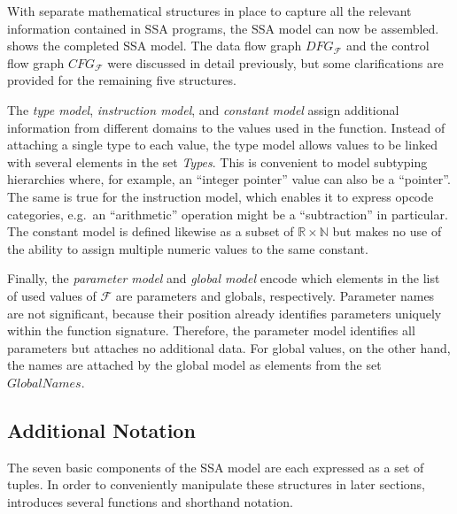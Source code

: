 \begin{figure}[p]
    
\end{figure}

    With separate mathematical structures in place to capture all the relevant
    information contained in SSA programs, the SSA model can now be assembled.
     shows the completed SSA model.
    The data flow graph $DFG_\mathcal F$ and the control flow graph
    $CFG_\mathcal F$ were discussed in detail previously, but some
    clarifications are provided for the remaining five structures.

    The {\it type model}, {\it instruction model}, and {\it constant model}
    assign additional information from different domains to the values used in
    the function.
    Instead of attaching a single type to each value, the type model
    allows values to be linked with several elements in the set {\it Types}.
    This is convenient to model subtyping hierarchies where, for example, an
    ``integer pointer'' value can also be a ``pointer''.
    The same is true for the instruction model, which enables it to express
    opcode categories, e.g.\ an ``arithmetic'' operation might be a
    ``subtraction'' in particular.
    The constant model is defined likewise as a subset of
    $\mathbb R\times\mathbb N$ but makes no use of the ability to assign
    multiple numeric values to the same constant.
    
    Finally, the {\it parameter model} and {\it global model} encode which
    elements in the list of used values of $\mathcal F$ are parameters and
    globals, respectively.
    Parameter names are not significant, because their position already
    identifies parameters uniquely within the function signature.
    Therefore, the parameter model identifies all parameters but attaches
    no additional data.
    For global values, on the other hand, the names are attached by the
    global model as elements from the set $GlobalNames$.

\subsection{Additional Notation}

    The seven basic components of the SSA model are each expressed as a set of
    tuples.
    In order to conveniently manipulate these structures in later sections, 
     introduces several functions and shorthand notation.

